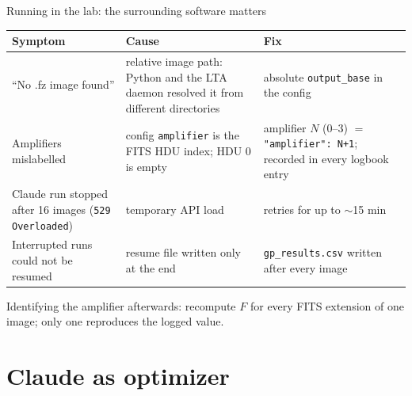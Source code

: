 \documentclass[aspectratio=169,10pt]{beamer}
\begin{document}
\begin{frame}{Running in the lab: the surrounding software matters}
  \small
  \begin{tabular}{p{}p{}p{}}
    \toprule
    Symptom & Cause & Fix \\
    \midrule
    ``No .fz image found'' & relative image path: Python and the LTA daemon resolved it from
      different directories & absolute \texttt{output\_base} in the config \\[1mm]
    Amplifiers mislabelled & config \texttt{amplifier} is the FITS HDU index; HDU 0 is empty &
      amplifier $N$ (0--3) $=$ \texttt{"amplifier": N+1}; recorded in every logbook entry \\[1mm]
    Claude run stopped after 16 images (\texttt{529 Overloaded}) & temporary API load &
      retries for up to $\sim$15 min \\[1mm]
    Interrupted runs could not be resumed & resume file written only at the end &
      \texttt{gp\_results.csv} written after every image \\
    \bottomrule
  \end{tabular}

  \vspace{3mm}
  Identifying the amplifier afterwards: recompute $F$ for every FITS extension of one image;
  only one reproduces the logged value.
\end{frame}

\section{Claude as optimizer}
\end{document}
